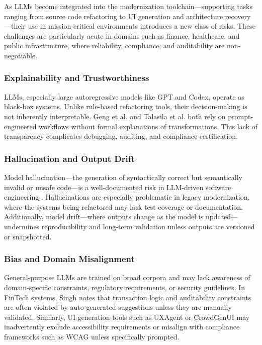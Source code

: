 \documentclass[12pt]{article}
\begin{document}
As LLMs become integrated into the modernization toolchain—supporting tasks ranging from source code refactoring to UI generation and architecture recovery—their use in mission-critical environments introduces a new class of risks. These challenges are particularly acute in domains such as finance, healthcare, and public infrastructure, where reliability, compliance, and auditability are non-negotiable.

\subsubsection{Explainability and Trustworthiness}

LLMs, especially large autoregressive models like GPT and Codex, operate as black-box systems. Unlike rule-based refactoring tools, their decision-making is not inherently interpretable. Geng et al. \cite{geng2024} and Talasila et al. \cite{talasila2023} both rely on prompt-engineered workflows without formal explanations of transformations. This lack of transparency complicates debugging, auditing, and compliance certification.

\subsubsection{Hallucination and Output Drift}

Model hallucination—the generation of syntactically correct but semantically invalid or unsafe code—is a well-documented risk in LLM-driven software engineering \cite{llmigrate2025, googlemigrate2025}. Hallucinations are especially problematic in legacy modernization, where the systems being refactored may lack test coverage or documentation. Additionally, model drift—where outputs change as the model is updated—undermines reproducibility and long-term validation unless outputs are versioned or snapshotted.

\subsubsection{Bias and Domain Misalignment}

General-purpose LLMs are trained on broad corpora and may lack awareness of domain-specific constraints, regulatory requirements, or security guidelines. In FinTech systems, Singh \cite{singh2024} notes that transaction logic and auditability constraints are often violated by auto-generated suggestions unless they are manually validated. Similarly, UI generation tools such as UXAgent \cite{zhao2024uxagent} or CrowdGenUI \cite{liu2024crowdgenui} may inadvertently exclude accessibility requirements or misalign with compliance frameworks such as WCAG unless specifically prompted.
\end{document}
